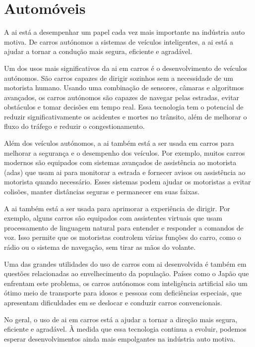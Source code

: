 \documentclass{report}
\begin{document}
\chapter{Automóveis}
\label{chap.automoveis}

A \ac{ai} está a desempenhar um papel cada vez mais importante na indústria auto motiva. De carros autónomos a sistemas de veículos inteligentes, a \ac{ai} está a ajudar a tornar a condução mais segura, eficiente e agradável.

Um dos usos mais significativos da \ac{ai} em carros é o desenvolvimento de veículos autónomos. São carros capazes de dirigir sozinhos sem a necessidade de um motorista humano. Usando uma combinação de sensores, câmaras e algoritmos avançados, os carros autónomos são capazes de navegar pelas estradas, evitar obstáculos e tomar decisões em tempo real. Essa tecnologia tem o potencial de reduzir significativamente os acidentes e mortes no trânsito, além de melhorar o fluxo do tráfego e reduzir o congestionamento.

Além dos veículos autónomos, a \ac{ai} também está a ser usada em carros para melhorar a segurança e o desempenho dos veículos. Por exemplo, muitos carros modernos são equipados com sistemas avançados de assistência ao motorista (\ac{adas}) que usam \ac{ai} para monitorar a estrada e fornecer avisos ou assistência ao motorista quando necessário. Esses sistemas podem ajudar os motoristas a evitar colisões, manter distâncias seguras e permanecer em suas faixas.

A \ac{ai} também está a ser usada para aprimorar a experiência de dirigir. Por exemplo, alguns carros são equipados com assistentes virtuais que usam processamento de linguagem natural para entender e responder a comandos de voz. Isso permite que os motoristas controlem várias funções do carro, como o rádio ou o sistema de navegação, sem tirar as mãos do volante.

Uma das grandes utilidades do uso de carros com \ac{ai} desenvolvida é também em questões relacionadas ao envelhecimento da população. Países como o Japão que enfrentam este problema, os carros autónomos com inteligência artificial são um ótimo meio de transporte para idosos e pessoas com deficiências especiais, que apresentam dificuldades em se deslocar e conduzir carros convencionais.

No geral, o uso de \ac{ai} em carros está a ajudar a tornar a direção mais segura, eficiente e agradável. À medida que essa tecnologia continua a evoluir, podemos esperar desenvolvimentos ainda mais empolgantes na indústria auto motiva.
\end{document}
